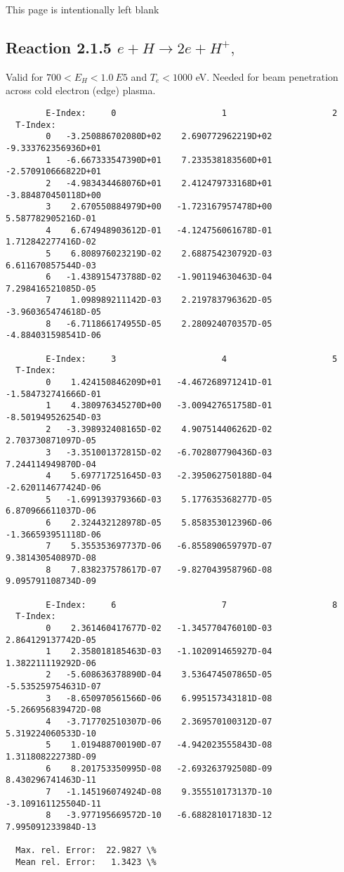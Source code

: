 \documentclass[12pt,dvipdfmx]{article}
\begin{document}
\newpage
This page is intentionally left blank
\newpage
\subsection{
Reaction 2.1.5  $e + H \rightarrow 2e + H^+ ,\ $ }

Valid for $ 700 < E_H < 1.0~ E5$ and $T_e  < 1000$ eV.
Needed for beam penetration across cold electron (edge) plasma.

\begin{small}\begin{verbatim}
        E-Index:     0                     1                     2
  T-Index:
        0   -3.250886702080D+02    2.690772962219D+02   -9.333762356936D+01
        1   -6.667333547390D+01    7.233538183560D+01   -2.570910666822D+01
        2   -4.983434468076D+01    2.412479733168D+01   -3.884870450118D+00
        3    2.670550884979D+00   -1.723167957478D+00    5.587782905216D-01
        4    6.674948903612D-01   -4.124756061678D-01    1.712842277416D-02
        5    6.808976023219D-02    2.688754230792D-03    6.611670857544D-03
        6   -1.438915473788D-02   -1.901194630463D-04    7.298416521085D-05
        7    1.098989211142D-03    2.219783796362D-05   -3.960365474618D-05
        8   -6.711866174955D-05    2.280924070357D-05   -4.884031598541D-06

        E-Index:     3                     4                     5
  T-Index:
        0    1.424150846209D+01   -4.467268971241D-01   -1.584732741666D-01
        1    4.380976345270D+00   -3.009427651758D-01   -8.501949526254D-03
        2   -3.398932408165D-02    4.907514406262D-02    2.703730871097D-05
        3   -3.351001372815D-02   -6.702807790436D-03    7.244114949870D-04
        4    5.697717251645D-03   -2.395062750188D-04   -2.620114677424D-06
        5   -1.699139379366D-03    5.177635368277D-05    6.870966611037D-06
        6    2.324432128978D-05    5.858353012396D-06   -1.366593951118D-06
        7    5.355353697737D-06   -6.855890659797D-07    9.381430540897D-08
        8    7.838237578617D-07   -9.827043958796D-08    9.095791108734D-09

        E-Index:     6                     7                     8
  T-Index:
        0    2.361460417677D-02   -1.345770476010D-03    2.864129137742D-05
        1    2.358018185463D-03   -1.102091465927D-04    1.382211119292D-06
        2   -5.608636378890D-04    3.536474507865D-05   -5.535259754631D-07
        3   -8.650970561566D-06    6.995157343181D-08   -5.266956839472D-08
        4   -3.717702510307D-06    2.369570100312D-07    5.319224060533D-10
        5    1.019488700190D-07   -4.942023555843D-08    1.311808222738D-09
        6    8.201753350995D-08   -2.693263792508D-09    8.430296741463D-11
        7   -1.145196074924D-08    9.355510173137D-10   -3.109161125504D-11
        8   -3.977195669572D-10   -6.688281017183D-12    7.995091233984D-13

  Max. rel. Error:  22.9827 \%
  Mean rel. Error:   1.3423 \%

\end{verbatim}\end{small}
\end{document}
